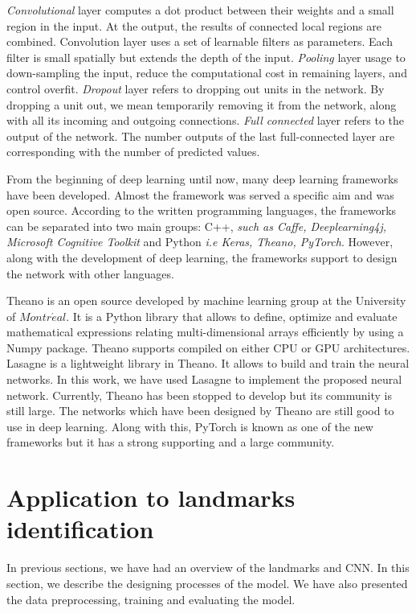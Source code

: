 \documentclass[conference]{IEEEtran}
\begin{document}
\textit{Convolutional} layer computes a dot product between their weights and a small region in the input. At the output, the results of connected local regions are combined. Convolution layer uses a set of learnable filters as parameters. Each filter is small spatially but extends the depth of the input. \textit{Pooling} layer usage to down-sampling the input, reduce the computational cost in remaining layers, and control overfit. \textit{Dropout} layer refers to dropping out units in the network. By dropping a unit out, we mean temporarily removing it from the network, along with all its incoming and outgoing connections. \textit{Full connected} layer refers to the output of the network. The number outputs of the last full-connected layer are corresponding with the number of predicted values.

From the beginning of deep learning until now, many deep learning frameworks have been developed. Almost the framework was served a specific aim and was open source. According to the written programming languages, the frameworks can be separated into two main groups: C++, \textit{such as Caffe, Deeplearning4j, Microsoft Cognitive Toolkit} and Python \textit{i.e Keras, Theano, PyTorch}.  However, along with the development of deep learning, the frameworks support to design the network with other languages.

Theano is an open source developed by machine learning group at the University of $Montr\acute{e}al$. It is a Python library that allows to define, optimize and evaluate mathematical expressions relating multi-dimensional arrays efficiently by using a Numpy package. Theano supports compiled on either CPU or GPU architectures. Lasagne\cite{lasagne} is a lightweight library in Theano. It allows to build and train the neural networks. In this work, we have used Lasagne to implement the proposed neural network. Currently, Theano has been stopped to develop but its community is still large. The networks which have been designed by Theano are still good to use in deep learning. Along with this, PyTorch is known as one of the new frameworks but it has a strong supporting and a large community.
\section{Application to landmarks identification}
In previous sections, we have had an overview of the landmarks and CNN. In this section, we describe the designing processes of the model. We have also presented the data preprocessing, training and evaluating the model.
\end{document}
